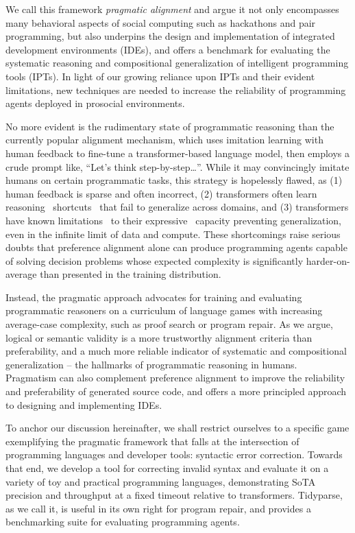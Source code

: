 \documentclass[sigplan,screen]{acmart}
\begin{document}
We call this framework \emph{pragmatic alignment} and argue it not only encompasses many behavioral aspects of social computing such as hackathons and pair programming, but also underpins the design and implementation of integrated development environments (IDEs), and offers a benchmark for evaluating the systematic reasoning and compositional generalization of intelligent programming tools (IPTs). In light of our growing reliance upon IPTs and their evident limitations, new techniques are needed to increase the reliability of programming agents deployed in prosocial environments.

No more evident is the rudimentary state of programmatic reasoning than the currently popular alignment mechanism, which uses imitation learning with human feedback to fine-tune a transformer-based language model, then employs a crude prompt like, ``Let's think step-by-step\ldots''. While it may convincingly imitate humans on certain programmatic tasks, this strategy is hopelessly flawed, as (1) human feedback is sparse and often incorrect, (2) transformers often learn reasoning~\cite{dziri2023faith} shortcuts~\cite{liu2022transformers} that fail to generalize across domains, and (3) transformers have known limitations~\cite{merrill2022saturated} to their expressive~\cite{chiang2023tighter} capacity preventing generalization, even in the infinite limit of data and compute. These shortcomings raise serious doubts that preference alignment alone can produce programming agents capable of solving decision problems whose expected complexity is significantly harder-on-average than presented in the training distribution.

Instead, the pragmatic approach advocates for training and evaluating programmatic reasoners on a curriculum of language games with increasing average-case complexity, such as proof search or program repair. As we argue, logical or semantic validity is a more trustworthy alignment criteria than preferability, and a much more reliable indicator of systematic and compositional generalization -- the hallmarks of programmatic reasoning in humans. Pragmatism can also complement preference alignment to improve the reliability and preferability of generated source code, and offers a more principled approach to designing and implementing IDEs.

To anchor our discussion hereinafter, we shall restrict ourselves to a specific game exemplifying the pragmatic framework that falls at the intersection of programming languages and developer tools: syntactic error correction. Towards that end, we develop a tool for correcting invalid syntax and evaluate it on a variety of toy and practical programming languages, demonstrating SoTA precision and throughput at a fixed timeout relative to transformers. Tidyparse, as we call it, is useful in its own right for program repair, and provides a benchmarking suite for evaluating programming agents.
\end{document}
